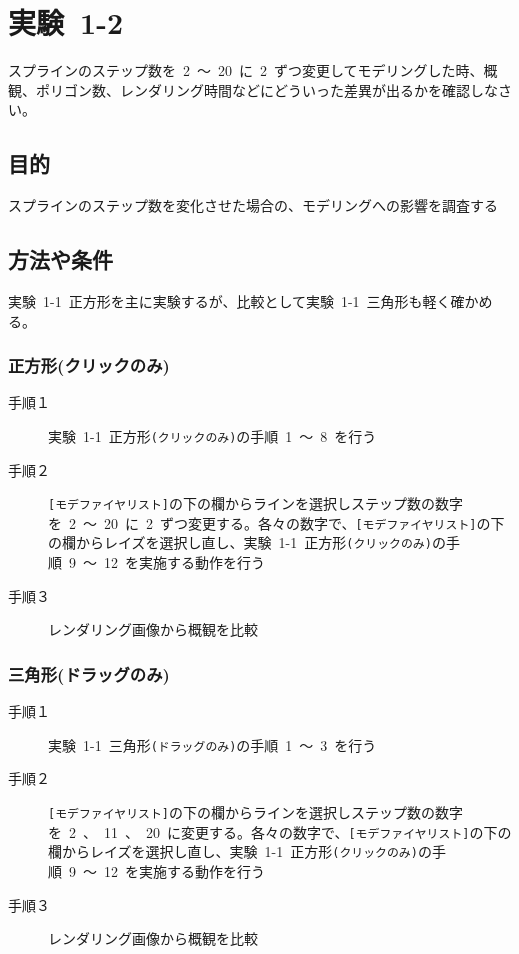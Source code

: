 \documentclass[a4j]{jarticle}
\begin{document}
\newpage
\section{実験\ 1-2}
スプラインのステップ数を\ 2\ ～\ 20\ に\ 2\ ずつ変更してモデリングした時、概観、ポリゴン数、レンダリング時間などにどういった差異が出るかを確認しなさい。
\subsection{目的}
%
スプラインのステップ数を変化させた場合の、モデリングへの影響を調査する
%
\subsection{方法や条件}
%
実験\ 1-1\ 正方形を主に実験するが、比較として実験\ 1-1\ 三角形も軽く確かめる。
\subsubsection{正方形(クリックのみ)}
\begin{description}
\item[手順１] 実験\ 1-1\ 正方形\verb|(クリックのみ)|の手順\ 1\ ～\ 8\ を行う
\item[手順２] \verb|[モデファイヤリスト]|の下の欄からラインを選択しステップ数の数字を\ 2\ ～\ 20\ に\ 2\ ずつ変更する。各々の数字で、\verb|[モデファイヤリスト]|の下の欄からレイズを選択し直し、実験\ 1-1\ 正方形\verb|(クリックのみ)|の手順\ 9\ ～\ 12\ を実施する動作を行う
\item[手順３] レンダリング画像から概観を比較
\end{description}
\subsubsection{三角形(ドラッグのみ)}
\begin{description}
\item[手順１] 実験\ 1-1\ 三角形\verb|(ドラッグのみ)|の手順\ 1\ ～\ 3\ を行う
\item[手順２] \verb|[モデファイヤリスト]|の下の欄からラインを選択しステップ数の数字を\ 2\ 、\ 11\ 、\ 20\ に変更する。各々の数字で、\verb|[モデファイヤリスト]|の下の欄からレイズを選択し直し、実験\ 1-1\ 正方形\verb|(クリックのみ)|の手順\ 9\ ～\ 12\ を実施する動作を行う
\item[手順３] レンダリング画像から概観を比較 
\end{description}
%
\end{document}

